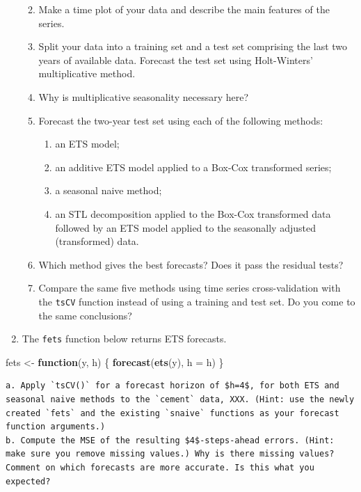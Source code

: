 \documentclass[]{book}
\newenvironment{Shaded}{\begin{snugshade}}{\end{snugshade}}
\newcommand{\ControlFlowTok}[1]{\textcolor[rgb]{0.13,0.29,0.53}{\textbf{#1}}}
\newcommand{\DataTypeTok}[1]{\textcolor[rgb]{0.13,0.29,0.53}{#1}}
\newcommand{\KeywordTok}[1]{\textcolor[rgb]{0.13,0.29,0.53}{\textbf{#1}}}
\newcommand{\NormalTok}[1]{#1}
\newcommand{\StringTok}[1]{\textcolor[rgb]{0.31,0.60,0.02}{#1}}
\providecommand{\tightlist}{%
  \setlength{\itemsep}{0pt}\setlength{\parskip}{0pt}}
\begin{document}
\begin{enumerate}
  \begin{enumerate}
  \def\labelenumii{\alph{enumii}.}
  \tightlist
  \item
    Make a time plot of your data and describe the main features of the series.
  \item
    Split your data into a training set and a test set comprising the last two years of available data. Forecast the test set using Holt-Winters' multiplicative method.
  \item
    Why is multiplicative seasonality necessary here?
  \item
    Forecast the two-year test set using each of the following methods:

    \begin{enumerate}
    \def\labelenumiii{\roman{enumiii})}
    \tightlist
    \item
      an ETS model;
    \item
      an additive ETS model applied to a Box-Cox transformed series;
    \item
      a seasonal naive method;
    \item
      an STL decomposition applied to the Box-Cox transformed data followed by an ETS model applied to the seasonally adjusted (transformed) data.
    \end{enumerate}
  \item
    Which method gives the best forecasts? Does it pass the residual tests?
  \item
    Compare the same five methods using time series cross-validation with the \texttt{tsCV} function instead of using a training and test set. Do you come to the same conclusions?
  \end{enumerate}
\item
  The \texttt{fets} function below returns ETS forecasts.
\end{enumerate}

\begin{Shaded}
\begin{Highlighting}[]
\NormalTok{  fets <-}\StringTok{ }\ControlFlowTok{function}\NormalTok{(y, h) \{}
  \KeywordTok{forecast}\NormalTok{(}\KeywordTok{ets}\NormalTok{(y), }\DataTypeTok{h =}\NormalTok{ h)}
\NormalTok{  \}}
\end{Highlighting}
\end{Shaded}

\begin{verbatim}
a. Apply `tsCV()` for a forecast horizon of $h=4$, for both ETS and seasonal naive methods to the `cement` data, XXX. (Hint: use the newly created `fets` and the existing `snaive` functions as your forecast function arguments.)
b. Compute the MSE of the resulting $4$-steps-ahead errors. (Hint: make sure you remove missing values.) Why is there missing values? Comment on which forecasts are more accurate. Is this what you expected?
\end{verbatim}
\end{document}
